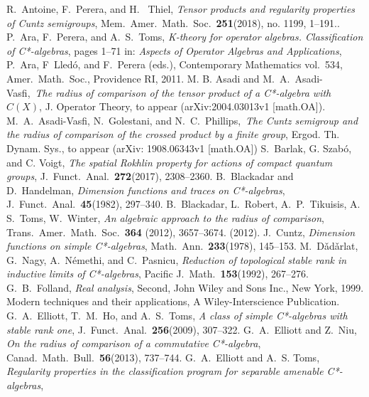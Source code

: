 \documentclass[10pt]{amsart}
\numberwithin{equation}{section}
\theoremstyle{definition}
\begin{document}
\begin{thebibliography}{99}
R.\ Antoine, F.\ Perera, and  H. \ Thiel, 
{\emph{Tensor products and regularity properties of Cuntz semigroups}},
Mem.\ Amer.\ Math.\ Soc.\ {\textbf{251}}(2018), no. 1199, 1–191..
%
P.~Ara, F.~Perera, and A.~S.\  Toms,
{\emph{K-theory for operator algebras. Classification of C*-algebras}},
pages 1--71 in:
{\emph{Aspects of Operator Algebras and Applications}},
P.~Ara, F~Lled\'{o}, and F.~Perera (eds.),
Contemporary Mathematics vol.~534,
Amer.\  Math.\  Soc., Providence RI, 2011.
%
M. B. Asadi and M.~A.\  Asadi-Vasfi,\ 
{\emph{The radius of comparison of the 
tensor product of a C*-algebra with $C (X)$}},
J. Operator Theory, to appear (arXiv:2004.03013v1 [math.OA]). 
%
M.~A.\  Asadi-Vasfi, N.~Golestani, and N.~C.\  Phillips,\ 
{\emph{The Cuntz semigroup and the radius of comparison of the crossed product by a finite group}},
Ergod. Th. Dynam. Sys., to appear (arXiv: 1908.06343v1 [math.OA])
%
\bibitem{BSV17}
S.\ Barlak, G. Szabó, and C. Voigt,
{\emph{The spatial Rokhlin property for actions of compact quantum groups}},
J.~Funct.\  Anal.\  {\textbf{272}}(2017), 2308--2360.
%
 B.~Blackadar and D.~Handelman,
{\emph{Dimension functions and traces on C*-algebras}},
J.~Funct.\  Anal.\  {\textbf{45}}(1982), 297--340.
%
 B.\, Blackadar, L.\,  Robert, A.\, P.\,  Tikuisis, A.\, S.\,  Toms, W.\,  Winter,
\emph{An algebraic approach to the radius of comparison}, Trans.\
Amer.\  Math.\  Soc.\ {\textbf{364}} (2012), 3657--3674. (2012).
%
\bibitem{Cun78} J.~Cuntz,
{\emph{Dimension functions on simple C*-algebras}},
Math.\  Ann.\  {\textbf{233}}(1978), 145--153.
%
%
M.~D\v{a}d\v{a}rlat, G.~Nagy, A.~N\'{e}methi, and C.~Pasnicu,
{\emph{Reduction of topological stable
     rank in inductive limits of C*-algebras}},
Pacific J.\  Math.\  {\textbf{153}}(1992),  267--276.
%
\bibitem{FR99}
G.\ B.\ Folland,
{\emph{Real analysis}},
Second, John Wiley and Sons Inc., New York, 1999.
Modern techniques
and their applications, A Wiley-Interscience Publication.
%
\bibitem{ElHoTm}
G.~A.\  Elliott, T.~M.\  Ho, and A.~S.\  Toms,
{\emph{A class of simple C*-algebras with stable rank one}},
J.~Funct.\  Anal.\  {\textbf{256}}(2009), 307--322.
%
\bibitem{EN13}
G.~A.\  Elliott and Z.~Niu,
{\emph{On the radius of comparison of a commutative C*-algebra}},
Canad.\  Math.\  Bull.\  {\textbf{56}}(2013), 737--744.
%
\bibitem{ET08}
G.~A.\  Elliott and A.\, S. Toms,
{\emph{Regularity properties in the classification program for separable amenable C*-algebras}},

\end{thebibliography}
\end{document}
